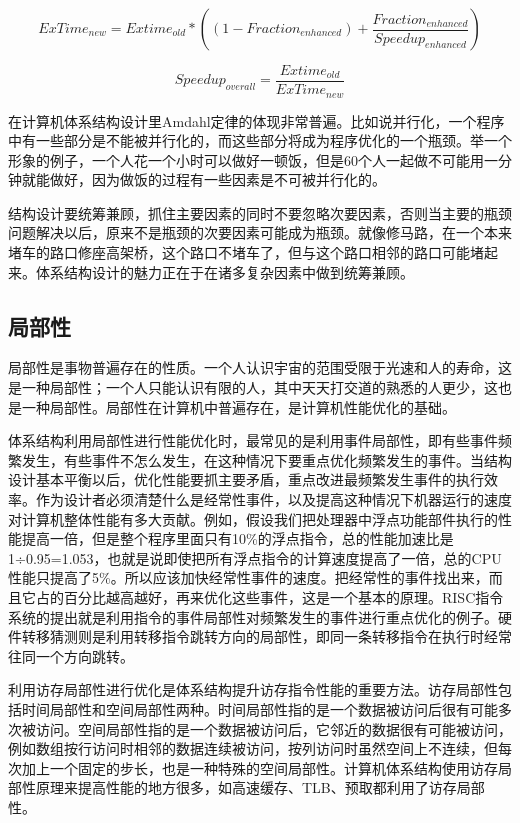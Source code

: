 \documentclass[]{ctexbook}
\begin{document}
\[ ExTime_{new} = Extime_{old} * \left((1 - Fraction_{enhanced}) + \frac{Fraction_{enhanced}}{Speedup_{enhanced}}\right) \]

\[ Speedup_{overall} = \frac{Extime_{old}}{ExTime_{new}} \]

在计算机体系结构设计里Amdahl定律的体现非常普遍。比如说并行化，一个程序中有一些部分是不能被并行化的，而这些部分将成为程序优化的一个瓶颈。举一个形象的例子，一个人花一个小时可以做好一顿饭，但是60个人一起做不可能用一分钟就能做好，因为做饭的过程有一些因素是不可被并行化的。

结构设计要统筹兼顾，抓住主要因素的同时不要忽略次要因素，否则当主要的瓶颈问题解决以后，原来不是瓶颈的次要因素可能成为瓶颈。就像修马路，在一个本来堵车的路口修座高架桥，这个路口不堵车了，但与这个路口相邻的路口可能堵起来。体系结构设计的魅力正在于在诸多复杂因素中做到统筹兼顾。

\hypertarget{ux5c40ux90e8ux6027}{%
\subsection{局部性}\label{ux5c40ux90e8ux6027}}

局部性是事物普遍存在的性质。一个人认识宇宙的范围受限于光速和人的寿命，这是一种局部性；一个人只能认识有限的人，其中天天打交道的熟悉的人更少，这也是一种局部性。局部性在计算机中普遍存在，是计算机性能优化的基础。

体系结构利用局部性进行性能优化时，最常见的是利用事件局部性，即有些事件频繁发生，有些事件不怎么发生，在这种情况下要重点优化频繁发生的事件。当结构设计基本平衡以后，优化性能要抓主要矛盾，重点改进最频繁发生事件的执行效率。作为设计者必须清楚什么是经常性事件，以及提高这种情况下机器运行的速度对计算机整体性能有多大贡献。例如，假设我们把处理器中浮点功能部件执行的性能提高一倍，但是整个程序里面只有10\%的浮点指令，总的性能加速比是1÷0.95=1.053，也就是说即使把所有浮点指令的计算速度提高了一倍，总的CPU性能只提高了5\%。所以应该加快经常性事件的速度。把经常性的事件找出来，而且它占的百分比越高越好，再来优化这些事件，这是一个基本的原理。RISC指令系统的提出就是利用指令的事件局部性对频繁发生的事件进行重点优化的例子。硬件转移猜测则是利用转移指令跳转方向的局部性，即同一条转移指令在执行时经常往同一个方向跳转。

利用访存局部性进行优化是体系结构提升访存指令性能的重要方法。访存局部性包括时间局部性和空间局部性两种。时间局部性指的是一个数据被访问后很有可能多次被访问。空间局部性指的是一个数据被访问后，它邻近的数据很有可能被访问，例如数组按行访问时相邻的数据连续被访问，按列访问时虽然空间上不连续，但每次加上一个固定的步长，也是一种特殊的空间局部性。计算机体系结构使用访存局部性原理来提高性能的地方很多，如高速缓存、TLB、预取都利用了访存局部性。
\end{document}
